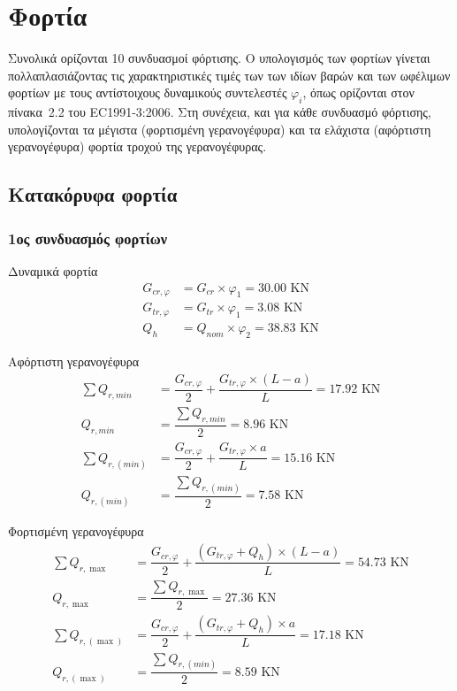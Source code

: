 \section{Φορτία}
Συνολικά ορίζονται 10 συνδυασμοί φόρτισης. Ο υπολογισμός των φορτίων γίνεται πολλαπλασιάζοντας τις χαρακτηριστικές τιμές των των ιδίων βαρών και των ωφέλιμων φορτίων με τους αντίστοιχους δυναμικούς συντελεστές $φ_i$, όπως ορίζονται στον πίνακα~2.2 του EC1991-3:2006. Στη συνέχεια, και για κάθε συνδυασμό φόρτισης, υπολογίζονται τα μέγιστα (φορτισμένη γερανογέφυρα) και τα ελάχιστα (αφόρτιστη γερανογέφυρα) φορτία τροχού της γερανογέφυρας.

\subsection{Κατακόρυφα φορτία}
\subsubsection{1ος συνδυασμός φορτίων}
Δυναμικά  φορτία
\begin{align*}
G_{cr,φ}  &= G_{cr} \times φ_1  =  30.00 \text{ KN} \\
G_{tr,φ}  &= G_{tr} \times φ_1  =   3.08 \text{ KN} \\
Q_h       &= Q_{nom} \times φ_2 =  38.83   \text{ KN}
\end{align*}

Αφόρτιστη γερανογέφυρα
\begin{align*}
\sum{Q_{r,min}}   &= \dfrac{G_{cr,φ}}{2} + \dfrac{G_{tr,φ} \times (L - a)}{L} =  17.92 \text{ KN} \\
Q_{r,min}         &= \dfrac{\displaystyle\sum{Q_{r,min}}}{2}                  =   8.96  \text{ KN} \\
\sum{Q_{r,(min)}} &= \dfrac{G_{cr,φ}}{2} + \dfrac{G_{tr,φ} \times a}{L}       =  15.16 \text{ KN} \\
Q_{r,(min)}       &= \dfrac{\displaystyle\sum{Q_{r,(min)}}}{2}                =   7.58  \text{ KN}
\end{align*}

Φορτισμένη γερανογέφυρα
\begin{align*}
\sum{Q_{r,\max}}     &= \dfrac{G_{cr,φ}}{2} + \dfrac{(G_{tr,φ} + Q_h) \times (L - a)}{L}   =  54.73 \text{ KN} \\
Q_{r,\max}           &= \dfrac{\displaystyle\sum{Q_{r,\max}}}{2}                           =  27.36  \text{ KN} \\
\sum{Q_{r,(\max)}}   &= \dfrac{G_{cr,φ}}{2} + \dfrac{(G_{tr,φ} + Q_h) \times a}{L}         =  17.18 \text{ KN} \\
Q_{r,(\max)}         &= \dfrac{\displaystyle\sum{Q_{r,(min)}}}{2}                          =   8.59 \text{ KN}
\end{align*}

